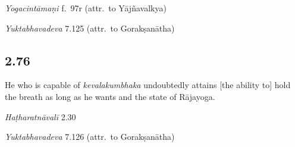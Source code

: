\begin{ekdosis}
\begin{testimonia}[hp02_075]
\begin{versinnote}
\end{versinnote}

\emph{Yogacintāmaṇi} f.~97r (attr.~to Yājñavalkya)

\begin{versinnote}
\end{versinnote}

\emph{Yuktabhavadeva} 7.125 (attr.~to Gorakṣanātha)

\begin{versinnote}
\end{versinnote}

\end{testimonia}

\subsection*{2.76}
\begin{translation}[hp02_076]
He who is capable of \emph{kevalakumbhaka} undoubtedly attains [the ability to] hold the breath as long as he wants and the state of Rājayoga.
\end{translation}

\begin{testimonia}[hp02_076]
\emph{Haṭharatnāvalī} 2.30

\begin{versinnote}
\end{versinnote}

\emph{Yuktabhavadeva} 7.126 (attr.~to Gorakṣanātha)

\begin{versinnote}
\end{versinnote}


\end{testimonia}
\end{ekdosis}
